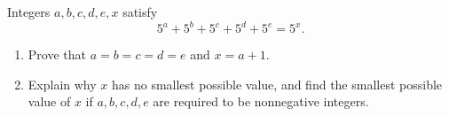 Integers $a,b,c,d,e,x$ satisfy
\[
5^a+5^b+5^c+5^d+5^e=5^x .
\]
\begin{enumerate}
\item[(a)] Prove that $a=b=c=d=e$ and $x=a+1$.
\item[(b)] Explain why $x$ has no smallest possible value, and find the smallest possible value of $x$ if $a,b,c,d,e$ are required to be nonnegative integers.
\end{enumerate}
